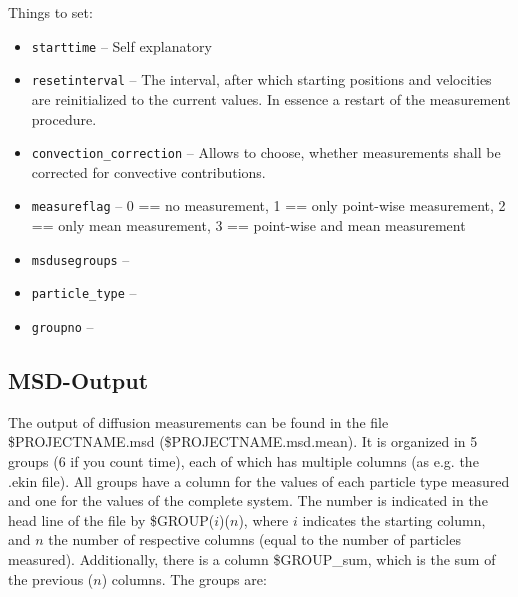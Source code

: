 Things to set:
\begin{itemize}
\item \texttt{starttime} -- Self explanatory
\item \texttt{resetinterval} -- The interval, after which starting positions and velocities are reinitialized to the current values. In essence a restart of the measurement procedure.
\item \texttt{convection\_correction} -- Allows to choose, whether measurements shall be corrected for convective contributions.
\item \texttt{measureflag} -- 0 == no measurement, 1 == only point-wise measurement, 2 == only mean measurement, 3 == point-wise and mean measurement
\item \texttt{msdusegroups} -- 
\item \texttt{particle\_type} -- 
\item \texttt{groupno} -- 
\end{itemize}

\subsection{MSD-Output}
The output of diffusion measurements can be found in the file \$PROJECTNAME.msd (\$PROJECTNAME.msd.mean). It is organized in 5 groups (6 if you count time), each of which has multiple columns (as e.g. the .ekin file). All groups have a column for the values of each particle type measured and one for the values of the complete system. The number is indicated in the head line of the file
by \$GROUP($i$)($n$), where $i$ indicates the starting column, and $n$ the number of respective columns (equal to the number of particles measured). Additionally, there is a column \$GROUP\_sum, which is the sum of the previous ($n$) columns. The groups are:

